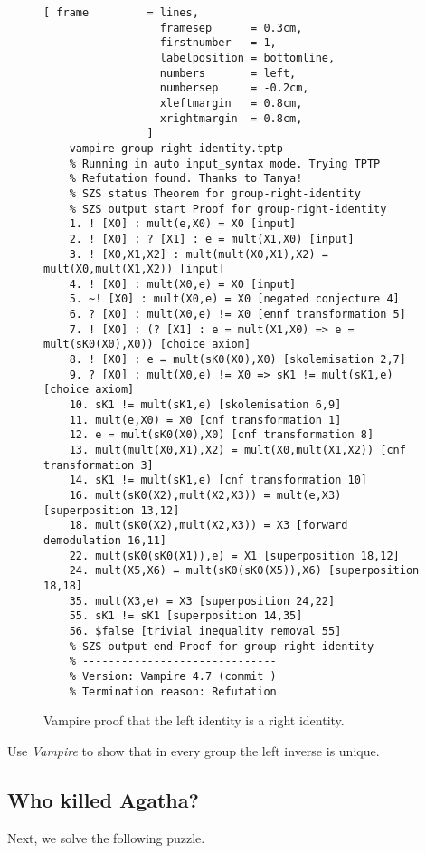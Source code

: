 \begin{figure}[!ht]
\centering
\begin{Verbatim}[ frame         = lines, 
                  framesep      = 0.3cm, 
                  firstnumber   = 1,
                  labelposition = bottomline,
                  numbers       = left,
                  numbersep     = -0.2cm,
                  xleftmargin   = 0.8cm,
                  xrightmargin  = 0.8cm,
                ]
    vampire group-right-identity.tptp
    % Running in auto input_syntax mode. Trying TPTP
    % Refutation found. Thanks to Tanya!
    % SZS status Theorem for group-right-identity
    % SZS output start Proof for group-right-identity
    1. ! [X0] : mult(e,X0) = X0 [input]
    2. ! [X0] : ? [X1] : e = mult(X1,X0) [input]
    3. ! [X0,X1,X2] : mult(mult(X0,X1),X2) = mult(X0,mult(X1,X2)) [input]
    4. ! [X0] : mult(X0,e) = X0 [input]
    5. ~! [X0] : mult(X0,e) = X0 [negated conjecture 4]
    6. ? [X0] : mult(X0,e) != X0 [ennf transformation 5]
    7. ! [X0] : (? [X1] : e = mult(X1,X0) => e = mult(sK0(X0),X0)) [choice axiom]
    8. ! [X0] : e = mult(sK0(X0),X0) [skolemisation 2,7]
    9. ? [X0] : mult(X0,e) != X0 => sK1 != mult(sK1,e) [choice axiom]
    10. sK1 != mult(sK1,e) [skolemisation 6,9]
    11. mult(e,X0) = X0 [cnf transformation 1]
    12. e = mult(sK0(X0),X0) [cnf transformation 8]
    13. mult(mult(X0,X1),X2) = mult(X0,mult(X1,X2)) [cnf transformation 3]
    14. sK1 != mult(sK1,e) [cnf transformation 10]
    16. mult(sK0(X2),mult(X2,X3)) = mult(e,X3) [superposition 13,12]
    18. mult(sK0(X2),mult(X2,X3)) = X3 [forward demodulation 16,11]
    22. mult(sK0(sK0(X1)),e) = X1 [superposition 18,12]
    24. mult(X5,X6) = mult(sK0(sK0(X5)),X6) [superposition 18,18]
    35. mult(X3,e) = X3 [superposition 24,22]
    55. sK1 != sK1 [superposition 14,35]
    56. $false [trivial inequality removal 55]
    % SZS output end Proof for group-right-identity
    % ------------------------------
    % Version: Vampire 4.7 (commit )
    % Termination reason: Refutation
\end{Verbatim} 
\vspace*{-0.3cm}
\caption{Vampire proof that the left identity is a right identity.}
\label{fig:group-right-identity.output} %
\end{figure}

\exerciseEng
Use \textsl{Vampire} to show that in every group the left inverse is unique. \eox

\subsection{Who killed Agatha?}
Next, we solve the following puzzle.

